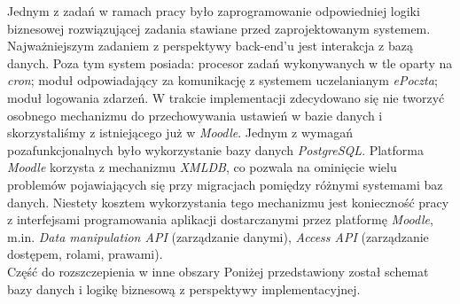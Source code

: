 Jednym z zadań w ramach pracy było zaprogramowanie odpowiedniej logiki biznesowej rozwiązującej zadania stawiane przed zaprojektowanym systemem. Najważniejszym zadaniem z perspektywy back-end'u jest interakcja z bazą danych. Poza tym system posiada: procesor zadań wykonywanych w tle oparty na \emph{cron}; moduł odpowiadający za komunikację z systemem uczelanianym \emph{ePoczta}; moduł logowania zdarzeń. W trakcie implementacji zdecydowano się nie tworzyć osobnego mechanizmu do przechowywania ustawień w bazie danych i skorzystaliśmy z istniejącego już w \emph{Moodle}. Jednym z wymagań pozafunkcjonalnych było wykorzystanie bazy danych \emph{PostgreSQL}. Platforma \emph{Moodle} korzysta z mechanizmu \emph{XMLDB}, co pozwala na ominięcie wielu problemów pojawiających się przy migracjach pomiędzy różnymi systemami baz danych. Niestety kosztem wykorzystania tego mechanizmu jest konieczność pracy z interfejsami programowania aplikacji dostarczanymi przez platformę \emph{Moodle}, m.in. \emph{Data manipulation API} (zarządzanie danymi), \emph{Access API} (zarządzanie dostępem, rolami, prawami).\\

{\color{red} Część do rozszczepienia w inne obszary}
Poniżej przedstawiony został schemat bazy danych i logikę biznesową z perspektywy implementacyjnej.

